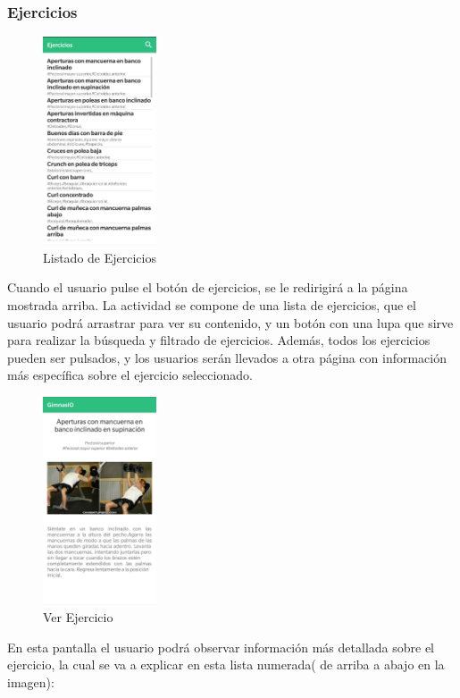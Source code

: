 \documentclass[11pt,a4paper]{report}
\begin{document}
\subsubsection{Ejercicios}
\begin{figure}[H]
	\centering
	\includegraphics[width=0.3\textwidth]{graficos/manual/ListaEjercicios.jpg}
	\caption{Listado de Ejercicios}
\end{figure}
Cuando el usuario pulse el botón de ejercicios, se le redirigirá a la página mostrada arriba. La actividad se compone de una lista de ejercicios, que el usuario podrá arrastrar para ver su contenido, y un botón con una lupa que sirve para realizar la búsqueda y filtrado de ejercicios. Además, todos los ejercicios pueden ser pulsados, y los usuarios serán llevados a otra página con información más específica sobre el ejercicio seleccionado.
\begin{figure}[H]
	\centering
	\includegraphics[width=0.3\textwidth]{graficos/manual/verEjercicio.jpg}
	\caption{Ver Ejercicio}
\end{figure}
En esta pantalla el usuario podrá observar información más detallada sobre el ejercicio, la cual se va a explicar en esta lista numerada( de arriba a abajo en la imagen):
\end{document}
